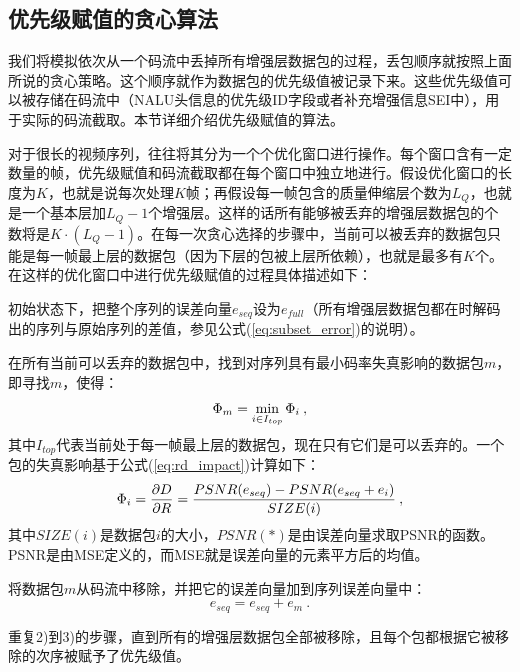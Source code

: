 \subsection{优先级赋值的贪心算法}
\label{subsec:priority-assign}

我们将模拟依次从一个码流中丢掉所有增强层数据包的过程，丢包顺序就按照上面所说的贪心策略。这个顺序就作为数据包的优先级值被记录下来。这些优先级值可以被存储在码流中（NALU头信息的优先级ID字段或者补充增强信息SEI中），用于实际的码流截取。本节详细介绍优先级赋值的算法。

对于很长的视频序列，往往将其分为一个个优化窗口进行操作。每个窗口含有一定数量的帧，优先级赋值和码流截取都在每个窗口中独立地进行。假设优化窗口的长度为$K$，也就是说每次处理$K$帧；再假设每一帧包含的质量伸缩层个数为$L_Q$，也就是一个基本层加$L_Q-1$个增强层。这样的话所有能够被丢弃的增强层数据包的个数将是$K \cdot (L_Q-1)$。在每一次贪心选择的步骤中，当前可以被丢弃的数据包只能是每一帧最上层的数据包（因为下层的包被上层所依赖），也就是最多有$K$个。在这样的优化窗口中进行优先级赋值的过程具体描述如下：

\begin{description}
	\vspace{10pt}
	\item[1)] 初始状态下，把整个序列的误差向量$e_{seq}$设为$e_{full}$（所有增强层数据包都在时解码出的序列与原始序列的差值，参见公式(\ref{eq:subset_error})的说明）。
	\vspace{10pt}
	\item[2)] 在所有当前可以丢弃的数据包中，找到对序列具有最小码率失真影响的数据包$m$，即寻找$m$，使得：
	\begin{equation}
	\vspace{10pt}
	\label{eq:R-D_impact_m}
	\Phi_m = \min_{i \in I_{top}} \Phi_i \: ,
	\end{equation}
	其中$I_{top}$代表当前处于每一帧最上层的数据包，现在只有它们是可以丢弃的。一个包的失真影响基于公式(\ref{eq:rd_impact})计算如下： 
	\begin{equation}
	\vspace{10pt}
	\label{eq:R-D_impact_i}
	\Phi_i = \dfrac{\partial D}{\partial R} = \dfrac{PSNR(e_{seq}) - PSNR(e_{seq} + e_i)}{SIZE(i)} \: ,
	\end{equation}
	其中$SIZE(i)$是数据包$i$的大小，$PSNR(*)$是由误差向量求取PSNR的函数。PSNR是由MSE定义的，而MSE就是误差向量的元素平方后的均值。
	\vspace{10pt}
	\item[3)]将数据包$m$从码流中移除，并把它的误差向量加到序列误差向量中：
	\begin{equation}
	\label{eq:error_update}
	e_{seq} = e_{seq} + e_m \: .
	\end{equation}
	\vspace{10pt}
	\item[4)]重复2)到3)的步骤，直到所有的增强层数据包全部被移除，且每个包都根据它被移除的次序被赋予了优先级值。
	\vspace{10pt}
\end{description}

